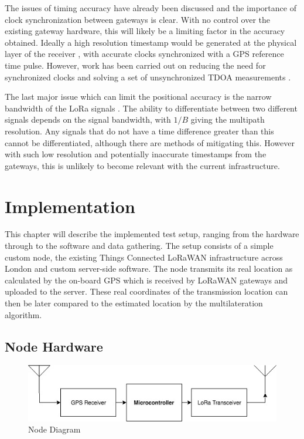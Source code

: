 \documentclass[a4paper]{report}
\begin{document}
      The issues of timing accuracy have already been discussed and the importance of clock synchronization between gateways is clear. With no control over the existing gateway hardware, this will likely be a limiting factor in the accuracy obtained. Ideally a high resolution timestamp would be generated at the physical layer of the receiver \cite{Li2011}, with accurate clocks synchronized with a GPS reference time pulse. However, work has been carried out on reducing the need for synchronized clocks \cite{Li2014} and solving a set of unsynchronized TDOA measurements \cite{Burgess2014}.

      The last major issue which can limit the positional accuracy is the narrow bandwidth of the LoRa signals \cite{LinkLabs}. The ability to differentiate between two different signals depends on the signal bandwidth, with \(1/B\) giving the multipath resolution. Any signals that do not have a time difference greater than this cannot be differentiated, although there are methods of mitigating this. However with such low resolution and potentially inaccurate timestamps from the gateways, this is unlikely to become relevant with the current infrastructure.

\chapter{Implementation}

  This chapter will describe the implemented test setup, ranging from the hardware through to the software and data gathering. The setup consists of a simple custom node, the existing Things Connected LoRaWAN infrastructure across London and custom server-side software. The node transmits its real location as calculated by the on-board GPS which is received by LoRaWAN gateways and uploaded to the server. These real coordinates of the transmission location can then be later compared to the estimated location by the multilateration algorithm.


  \section{Node Hardware}

    \begin{figure}
    \centering
    \includegraphics[width=12cm]{figures/node.jpeg}
    \caption{Node Diagram}
    \label{fig:node}
    \end{figure}
\end{document}
